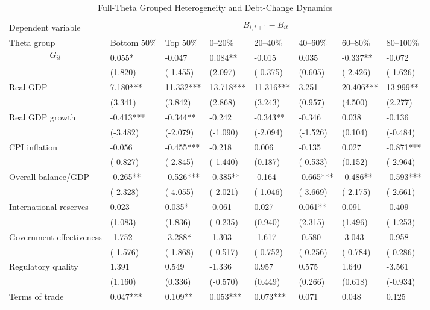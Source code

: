 \begin{table}[H]\centering
\begin{threeparttable}
\caption{Full-Theta Grouped Heterogeneity and Debt-Change Dynamics}
\label{tab:theta_group_heterogeneity_debt}
\scriptsize
\begin{tabularx}{\textwidth}{lYYYYYYY}
\toprule
Dependent variable &  \\
\cmidrule(lr){2-8}
Theta group & Bottom 50\% & Top 50\% & 0--20\% & 20--40\% & 40--60\% & 60--80\% & 80--100\% \\
\midrule
$$G_{it}$$ & 0.055* & -0.047 & 0.084** & -0.015 & 0.035 & -0.337** & -0.072 \\
  & (1.820) & (-1.455) & (2.097) & (-0.375) & (0.605) & (-2.426) & (-1.626) \\
Real GDP & 7.180*** & 11.332*** & 13.718*** & 11.316*** & 3.251 & 20.406*** & 13.999** \\
  & (3.341) & (3.842) & (2.868) & (3.243) & (0.957) & (4.500) & (2.277) \\
Real GDP growth & -0.413*** & -0.344** & -0.242 & -0.343** & -0.346 & 0.038 & -0.136 \\
  & (-3.482) & (-2.079) & (-1.090) & (-2.094) & (-1.526) & (0.104) & (-0.484) \\
CPI inflation & -0.056 & -0.455*** & -0.218 & 0.006 & -0.135 & 0.027 & -0.871*** \\
  & (-0.827) & (-2.845) & (-1.440) & (0.187) & (-0.533) & (0.152) & (-2.964) \\
Overall balance/GDP & -0.265** & -0.526*** & -0.385** & -0.164 & -0.665*** & -0.486** & -0.593*** \\
  & (-2.328) & (-4.055) & (-2.021) & (-1.046) & (-3.669) & (-2.175) & (-2.661) \\
International reserves & 0.023 & 0.035* & -0.061 & 0.027 & 0.061** & 0.091 & -0.409 \\
  & (1.083) & (1.836) & (-0.235) & (0.940) & (2.315) & (1.496) & (-1.253) \\
Government effectiveness & -1.752 & -3.288* & -1.303 & -1.617 & -0.580 & -3.043 & -0.958 \\
  & (-1.576) & (-1.868) & (-0.517) & (-0.752) & (-0.256) & (-0.784) & (-0.286) \\
Regulatory quality & 1.391 & 0.549 & -1.336 & 0.957 & 0.575 & 1.640 & -3.561 \\
  & (1.160) & (0.336) & (-0.570) & (0.449) & (0.266) & (0.618) & (-0.934) \\
Terms of trade & 0.047*** & 0.109** & 0.053*** & 0.073*** & 0.071 & 0.048 & 0.125 \\

\end{tabularx}
\end{threeparttable}
\end{table}
